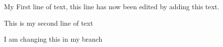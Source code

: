 \documentclass{article}
\begin{document}
My First line of text, this line has now been edited by adding this text.


This is my second line of text

I am changing this in my branch
\end{document}
